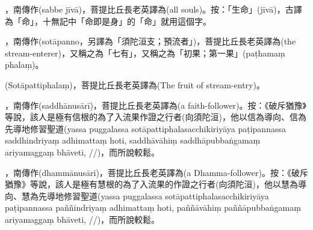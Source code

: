 \startitemgroup[noteitems]
\item{}，南傳作(sabbe jīvā)，菩提比丘長老英譯為(all souls)。按：「生命」(jīvā)，古譯為「命」，十無記中「命即是身」的「命」就用這個字。
\stopitemgroup

\startitemgroup[noteitems]
\item{}，南傳作(sotāpanno，另譯為「須陀洹支；預流者」)，菩提比丘長老英譯為(the stream-enterer)，又稱之為「七有」，又稱之為「初果；第一果」(paṭhamaṃ phalaṃ)。
\item{}(Sotāpattiphalaṃ)，菩提比丘長老英譯為(The fruit of stream-entry)。
\stopitemgroup

\startitemgroup[noteitems]
\item{}，南傳作(saddhānusārī)，菩提比丘長老英譯為(a faith-follower)。按：《破斥猶豫》等說，該人是極有信根的為了入流果作證之行者(向須陀洹)，他以信為導向、信為先導地修習聖道(yassa puggalassa sotāpattiphalasacchikiriyāya paṭipannassa saddhindriyaṃ adhimattaṃ hoti, saddhāvāhiṃ saddhāpubbaṅgamaṃ ariyamaggaṃ bhāveti, //)，而所說較鬆。
\stopitemgroup

\startitemgroup[noteitems]
\item{}，南傳作(dhammānusārī)，菩提比丘長老英譯為(a Dhamma-follower)。按：《破斥猶豫》等說，該人是極有慧根的為了入流果的作證之行者(向須陀洹)，他以慧為導向、慧為先導地修習聖道(yassa puggalassa sotāpattiphalasacchikiriyāya paṭipannassa paññindriyaṃ adhimattaṃ hoti, paññāvāhiṃ paññāpubbaṅgamaṃ ariyamaggaṃ bhāveti, //)，而所說較鬆。
\stopitemgroup

